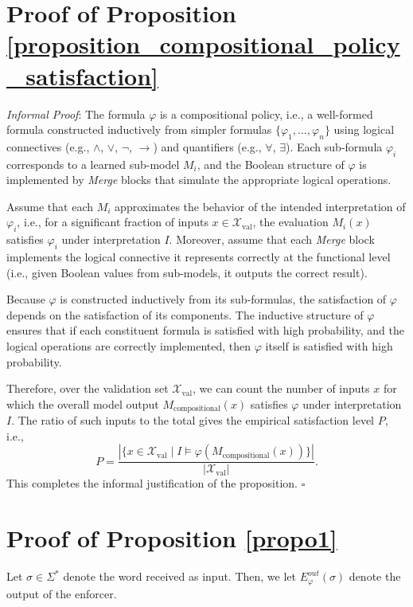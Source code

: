 \section{Proof of Proposition \ref{proposition_compositional_policy_satisfaction}}
\label{sec:proof_comp_policy}
\noindent \textit{Informal Proof}: 
The formula $\varphi$ is a compositional policy, i.e., a well-formed formula constructed inductively from simpler formulas $\{\varphi_1, \dots, \varphi_n\}$ using logical connectives (e.g., $\land$, $\lor$, $\lnot$, $\rightarrow$) and quantifiers (e.g., $\forall$, $\exists$). Each sub-formula $\varphi_i$ corresponds to a learned sub-model $M_i$, and the Boolean structure of $\varphi$ is implemented by \textit{Merge} blocks that simulate the appropriate logical operations.

Assume that each $M_i$ approximates the behavior of the intended interpretation of $\varphi_i$, i.e., for a significant fraction of inputs $x \in \mathcal{X}_{\text{val}}$, the evaluation $M_i(x)$ satisfies $\varphi_i$ under interpretation $I$. Moreover, assume that each \textit{Merge} block implements the logical connective it represents correctly at the functional level (i.e., given Boolean values from sub-models, it outputs the correct result).

Because $\varphi$ is constructed inductively from its sub-formulas, the satisfaction of $\varphi$ depends on the satisfaction of its components. The inductive structure of $\varphi$ ensures that if each constituent formula is satisfied with high probability, and the logical operations are correctly implemented, then $\varphi$ itself is satisfied with high probability.

Therefore, over the validation set $\mathcal{X}_{\text{val}}$, we can count the number of inputs $x$ for which the overall model output $M_{\text{compositional}}(x)$ satisfies $\varphi$ under interpretation $I$. The ratio of such inputs to the total gives the empirical satisfaction level $P$, i.e.,
\[
P = \frac{|\{x \in \mathcal{X}_{\text{val}} \mid I \models \varphi(M_{\text{compositional}}(x)) \}|}{|\mathcal{X}_{\text{val}}|}.
\]
This completes the informal justification of the proposition. $\square$


\section{Proof of Proposition \ref{propo1}}
\label{sec:proof}

Let $\sigma \in \Sigma^{\ast}$ denote the word received as input. Then, we let $E_{\varphi}^{out}(\sigma)$ denote the output of the enforcer.


